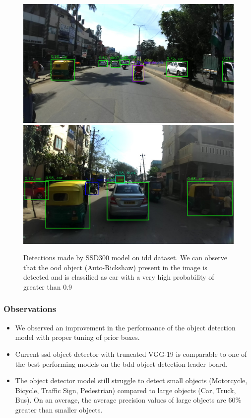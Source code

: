     \begin{figure}
        \centering
        \includegraphics[scale=0.35]{images/det_images/idd_2.jpg}
        \includegraphics[scale=0.35]{images/det_images/idd_1.jpg}
        \caption[Detection on images from \acrshort{idd} dataset]{Detections made by SSD300 model on \acrshort{idd} dataset. We can observe that the \acrshort{ood} object (Auto-Rickshaw) present in the image is detected and is classified as car with a very high probability of greater than 0.9}
        \label{fig:idd_detection}
    \end{figure}
    
    \subsubsection{Observations}
    \begin{itemize}
        \item We observed an improvement in the performance of the object detection model with proper tuning of prior boxes.
        \item Current \acrshort{ssd} object detector with truncated VGG-19 is comparable to one of the best performing models on the \acrshort{bdd} object detection leader-board.
        \item The object detector model still struggle to detect small objects (Motorcycle, Bicycle, Traffic Sign, Pedestrian) compared to large objects (Car, Truck, Bus). On an average, the average precision values of large objects are 60\% greater than smaller objects.
    \end{itemize}
